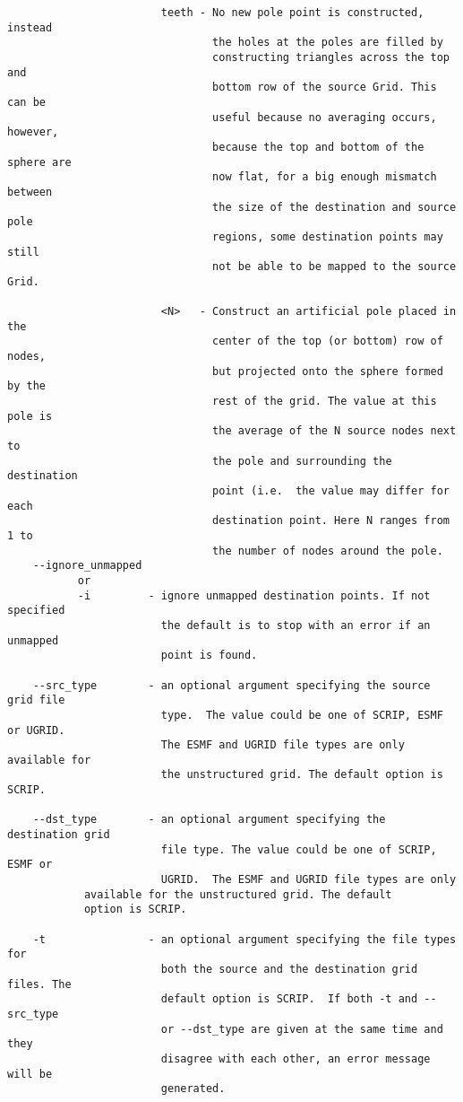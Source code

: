 \begin{verbatim}
                        teeth - No new pole point is constructed, instead 
                                the holes at the poles are filled by 
                                constructing triangles across the top and 
                                bottom row of the source Grid. This can be 
                                useful because no averaging occurs, however, 
                                because the top and bottom of the sphere are 
                                now flat, for a big enough mismatch between 
                                the size of the destination and source pole 
                                regions, some destination points may still 
                                not be able to be mapped to the source Grid. 

                        <N>   - Construct an artificial pole placed in the 
                                center of the top (or bottom) row of nodes, 
                                but projected onto the sphere formed by the 
                                rest of the grid. The value at this pole is 
                                the average of the N source nodes next to
                                the pole and surrounding the destination 
                                point (i.e.  the value may differ for each 
                                destination point. Here N ranges from 1 to 
                                the number of nodes around the pole. 
    --ignore_unmapped
           or 
           -i         - ignore unmapped destination points. If not specified
                        the default is to stop with an error if an unmapped
                        point is found. 

    --src_type        - an optional argument specifying the source grid file 
                        type.  The value could be one of SCRIP, ESMF or UGRID.  
                        The ESMF and UGRID file types are only available for 
                        the unstructured grid. The default option is SCRIP.

    --dst_type        - an optional argument specifying the destination grid 
                        file type. The value could be one of SCRIP, ESMF or 
                        UGRID.  The ESMF and UGRID file types are only 
			available for the unstructured grid. The default 
			option is SCRIP.

    -t                - an optional argument specifying the file types for 
                        both the source and the destination grid files. The 
                        default option is SCRIP.  If both -t and --src_type 
                        or --dst_type are given at the same time and they 
                        disagree with each other, an error message will be 
                        generated.


\end{verbatim}
